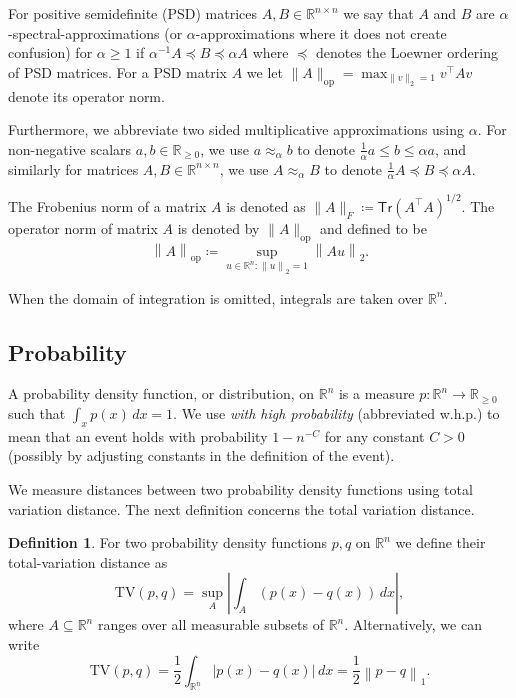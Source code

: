 \documentclass[11pt]{article}
\numberwithin{equation}{section}
\theoremstyle{definition}
\newtheorem{definition}[definition]{Definition}
\newcommand{\R}{\mathbb{R}}
\newcommand{\Tr}[1]{\mathsf{Tr}\left(#1\right)}
\newcommand{\TV}{\mathrm{TV}}
\newcommand{\abs}[1]{\left|#1\right|}
\newcommand{\norm}[1]{\left\lVert#1\right\rVert}
\newcommand{\pe}{\preceq}
\newcommand{\op}{\mathrm{op}}
\begin{document}
For positive semidefinite (PSD) matrices $A, B \in \R^{n \times n}$ we say that
$A$ and
$B$ are
$\alpha$-spectral-approximations (or
$\alpha$-approximations where it does not create confusion) for
$\alpha \ge 1$ if
$\alpha^{-1}A \pe B \pe \alpha A$ where
$\pe$ denotes the Loewner ordering of PSD matrices.
For a PSD matrix $A$ we let
$\|A\|_{\op} = \max_{\|v\|_2 = 1} v^\top Av$ denote its operator norm.

Furthermore, we abbreviate two sided multiplicative approximations using
$\alpha$.
For non-negative scalars $a, b \in \R_{\geq 0}$, we use
$a \approx_{\alpha} b$ to denote
$\frac{1}{\alpha} a \leq b \leq \alpha a$, and similarly for matrices
$A, B \in \R^{n \times n}$, we use
$A \approx_{\alpha} B$ to denote
$\frac{1}{\alpha} A \preceq B \preceq \alpha A$.

The Frobenius norm of a matrix $A$ is denoted as
$\|A\|_F \coloneq \Tr{A^\top A}^{1/2}$.
The operator norm of matrix $A$ is denoted by
$\|A\|_{\op}$ and defined to be
\[
\norm{A}_{\op}
\coloneq
\sup_{u \in \R^n : \norm{u}_2=1}
\norm{Au}_2.
\]

When the domain of integration is omitted, integrals are taken over $\R^n$.

\subsection{Probability}

A probability density function, or distribution, on $\R^{n}$ is a measure
$p: \R^{n} \rightarrow \R_{\geq 0}$ such that
$\int_{x} p(x) \, dx = 1$.
We use \emph{with high probability} (abbreviated w.h.p.) to mean that an event
holds with probability $1 - n^{-C}$ for any constant
$C > 0$ (possibly by adjusting constants in the definition of the event).

We measure distances between two probability density functions using total
variation distance.
The next definition concerns the total variation distance.

\begin{definition}
For two probability density functions $p, q$ on
$\R^n$ we define their total-variation distance as
\[
\TV\left(p, q\right)
=
\sup_A \abs{\int_A \left(p\left(x\right) - q\left(x\right)\right)\,dx},
\]
where $A \subseteq \R^n$ ranges over all measurable subsets of
$\R^n$.
Alternatively, we can write
\[
\TV\left(p, q\right)
= \frac{1}{2} \int_{\R^n} \abs{p\left(x\right) - q\left(x\right)}\,dx
= \frac{1}{2}\norm{p - q}_1.
\]
\end{definition}
\end{document}
